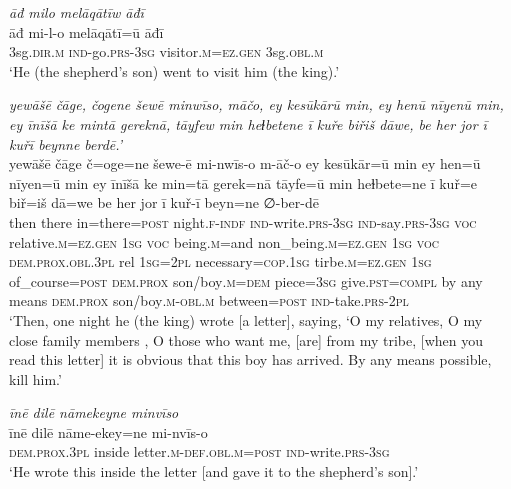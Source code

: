 \ea \label{KŠ.55}
\textit{āđ milo melāqātīw āđī} \\ 
\gll āđ mi-l-o melāqātī=ū āđī \\ 
 3sg\textsc{.dir}\textsc{.m} \textsc{ind-}go\textsc{.prs}\textsc{-3sg} visitor\textsc{.m}\textsc{=ez.gen} 3sg\textsc{.obl}\textsc{.m} \\ 
\glt `He (the shepherd’s son) went to visit him (the king).'
\z 
 
\ea \label{KŠ.56}
\textit{yewāšē čāge, čogene šewē minwīso, māčo, ey kesūkārū min, ey henū nīyenū min, ey īnīšā ke mintā gereknā, tāyfew min heɫbetene ī kuře biřiš dāwe, be her jor ī kuřī beynne berdē.’} \\ 
\gll yewāšē čāge č=oge=ne šewe-ē mi-nwīs-o m-āč-o ey kesūkār=ū min ey hen=ū nīyen=ū min ey īnīšā ke min=tā gerek=nā tāyfe=ū min heɫbete=ne ī kuř=e biř=iš dā=we be her jor ī kuř-ī beyn=ne ∅-ber-dē \\ 
 then there in=there\textsc{=\textsc{post}} night\textsc{.f}\textsc{-indf} \textsc{ind-}write\textsc{.prs}\textsc{-3sg} \textsc{ind-}say\textsc{.prs}\textsc{-3sg} \textsc{voc} relative\textsc{.m}\textsc{\textsc{=ez.gen}} \textsc{1sg} \textsc{voc} being\textsc{.m}=and non\_being\textsc{.m}\textsc{\textsc{=ez.gen}} \textsc{1sg} \textsc{voc} \textsc{dem.prox}\textsc{.obl}\textsc{.3pl} rel \textsc{1sg}=\textsc{2pl} necessary\textsc{=cop}\textsc{.\textsc{1sg}} tirbe\textsc{.m}\textsc{\textsc{=ez.gen}} \textsc{1sg} of\_course\textsc{=\textsc{post}} \textsc{dem.prox} son/boy\textsc{.m}\textsc{=dem} piece\textsc{=3sg} give\textsc{.pst}\textsc{=compl} by any means \textsc{dem.prox} son/boy\textsc{.m}\textsc{-obl}\textsc{.m} between\textsc{=\textsc{post}} \textsc{ind-}take\textsc{.prs}-\textsc{2pl} \\ 
\glt `Then, one night he (the king) wrote [a letter], saying, ‘O my relatives, O my close family members , O those who want me, [are] from my tribe, [when you read this letter] it is obvious that this boy has arrived. By any means possible, kill him.'
\z 
 
\ea \label{KŠ.57}
\textit{īnē dilē nāmekeyne minvīso} \\ 
\gll īnē dilē nāme-ekey=ne mi-nvīs-o \\ 
 \textsc{dem.prox}\textsc{.3pl} inside letter\textsc{.m}\textsc{-def}\textsc{.obl}\textsc{.m}\textsc{=\textsc{post}} \textsc{ind-}write\textsc{.prs}\textsc{-3sg} \\ 
\glt `He wrote this inside the letter [and gave it to the shepherd’s son].'
\z 
 
